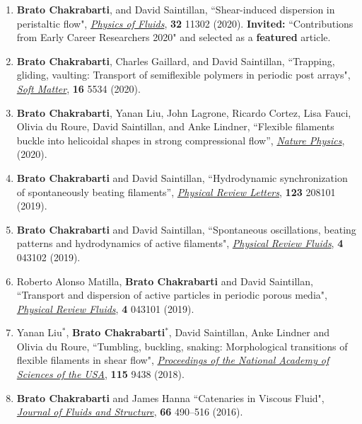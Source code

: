 \documentclass[10pt]{res} %
\begin{document}
\begin{resume}
\begin{enumerate}[topsep=0pt,itemsep= 1ex]
\item \textbf{Brato Chakrabarti}, and David Saintillan, ``Shear-induced dispersion in peristaltic flow", \href{https://doi.org/10.1063/5.0030569}{\textit{Physics of Fluids}}, \textbf{32} 11302 (2020).  \textbf{Invited:} ``Contributions from Early Career Researchers 2020" and selected as a \textbf{featured} article.

\item \textbf{Brato Chakrabarti}, Charles Gaillard, and David Saintillan, ``Trapping, gliding, vaulting: Transport of semiflexible polymers in periodic post arrays", \href{DOI	https://doi.org/10.1039/D0SM00390E}{\textit{Soft Matter}}, \textbf{16} 5534 (2020).


\item \textbf{Brato Chakrabarti}, Yanan Liu, John Lagrone, Ricardo Cortez, Lisa Fauci, Olivia du Roure, David Saintillan, and Anke Lindner, ``Flexible filaments buckle into helicoidal shapes in strong compressional flow'',  \href{https://doi.org/10.1038/s41567-020-0843-7}{\textit{Nature Physics}}, (2020).

\item \textbf{Brato Chakrabarti} and David Saintillan, ``Hydrodynamic synchronization of spontaneously beating filaments'', \href{https://doi.org/10.1103/PhysRevLett.123.208101}{\textit{Physical Review Letters}}, \textbf{123} 208101 (2019). 


\item \textbf{Brato Chakrabarti} and David Saintillan, ``Spontaneous oscillations, beating patterns and hydrodynamics of active filaments", \href{https://doi.org/10.1103/PhysRevFluids.4.043102}{\textit{Physical Review Fluids}}, \textbf{4} 043102 (2019). 


\item Roberto Alonso Matilla, \textbf{Brato Chakrabarti} and David Saintillan, ``Transport and dispersion of active particles in periodic porous media", \href{https://doi.org/10.1103/PhysRevFluids.4.043101}{\textit{Physical Review Fluids}}, \textbf{4} 043101 (2019). 

\item Yanan Liu$^*$, \textbf{Brato Chakrabarti}$^*$, David Saintillan, Anke Lindner and Olivia du Roure, ``Tumbling, buckling, snaking: Morphological transitions
of flexible filaments in shear flow", \href{https://doi.org/10.1073/pnas.1805399115}{\textit{Proceedings of the National Academy of Sciences of the USA}}, \textbf{115} 9438 (2018).


\item \textbf{Brato Chakrabarti} and James Hanna ``Catenaries in Viscous Fluid", \href{https://doi.org/10.1016/j.jfluidstructs.2016.04.009}{\textit{Journal of Fluids and Structure}}, \textbf{66} 490–516 (2016).
\end{enumerate}



\end{resume}
\end{document}
